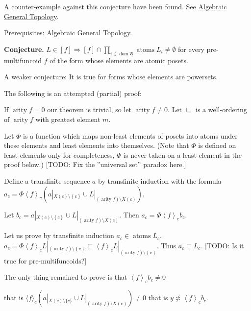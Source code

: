 \documentclass[12pt]{article}
\begin{document}
A counter-example against this conjecture have been found.
See \href{http://www.mathematics21.org/algebraic-general-topology.html}{Algebraic General Topology}.

Prerequisites: \href{http://www.mathematics21.org/algebraic-general-topology.html}{Algebraic General Topology}.

{\bf Conjecture.} $L \in \mathrel{\left[ f \right]} \Rightarrow \mathrel{\left[ f \right]} \cap \prod_{i \in \operatorname{dom} \mathfrak{A}} \operatorname{atoms} L_i \neq \emptyset$ for every pre-multifuncoid $f$ of the form whose elements are atomic posets.

A weaker conjecture: It is true for forms whose elements are powersets.

The following is an attempted (partial) proof:

If $\operatorname{arity} f = 0$ our theorem is trivial, so let $\operatorname{arity} f \neq 0$. Let $\sqsubseteq$ is a well-ordering of $\operatorname{arity} f$ with greatest element $m$.

Let $\Phi$ is a function which maps non-least elements of posets into atoms under these elements and least elements into themselves. (Note that $\Phi$ is defined on least elements only for completeness, $\Phi$ is never taken on a least element in the proof below.) {\color{brown} [TODO: Fix the ''universal set'' paradox here.]}

Define a transfinite sequence $a$ by transfinite induction with the formula $ a_c = \Phi \left\langle f \right\rangle_c  \left( a|_{X \left( c \right) \setminus \left\{ c \right\}} \cup L|_{\left( \operatorname{arity} f \right) \setminus X \left( c \right)} \right)$.

Let $b_c = a|_{X \left( c \right) \setminus \left\{ c \right\}} \cup L|_{\left( \operatorname{arity} f \right) \setminus X \left( c \right)}$. Then $a_c = \Phi \left\langle f \right\rangle_c b_c$.

Let us prove by transfinite induction $a_c \in \operatorname{atoms} L_c .$ $a_c = \Phi \left\langle f \right\rangle_c L|_{\left( \operatorname{arity} f \right) \setminus \left\{ c \right\}} \sqsubseteq \left\langle f \right\rangle_c L|_{\left( \operatorname{arity} f \right) \setminus \left\{ c \right\}}$. Thus $a_c \sqsubseteq L_c$. [TODO: Is it true for pre-multifuncoids?]

The only thing remained to prove is that $\left\langle f \right\rangle_c b_c \neq 0$

that is $\langle f \rangle _ c  ( a|_{ X ( c ) \setminus \{ c \} } \cup L|_{( \operatorname{arity} f ) \setminus X ( c )} ) \neq 0$ that is $y \not\asymp \left\langle f \right\rangle_c b_c$.
\end{document}
